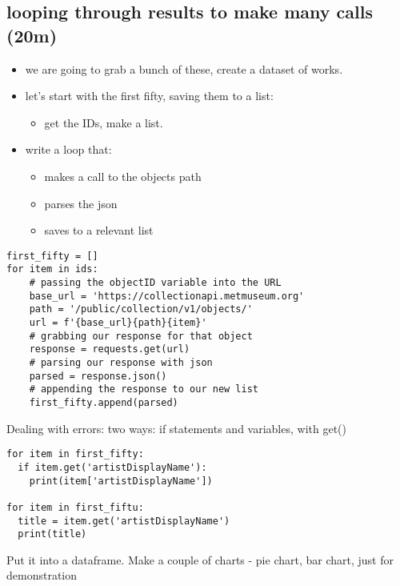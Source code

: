 \documentclass[11pt]{article}
\begin{document}
\subsection{looping through results to make many calls (20m)}
\label{sec:orgd85b085}
\begin{itemize}
\item we are going to grab a bunch of these, create a dataset of works.
\item let's start with the first fifty, saving them to a list:
\begin{itemize}
\item get the IDs, make a list.
\end{itemize}
\item write a loop that:
\begin{itemize}
\item makes a call to the objects path
\item parses the json
\item saves to a relevant list
\end{itemize}
\end{itemize}

\begin{verbatim}
first_fifty = []
for item in ids:
    # passing the objectID variable into the URL
    base_url = 'https://collectionapi.metmuseum.org'
    path = '/public/collection/v1/objects/'
    url = f'{base_url}{path}{item}'
    # grabbing our response for that object
    response = requests.get(url)
    # parsing our response with json
    parsed = response.json()
    # appending the response to our new list
    first_fifty.append(parsed)
\end{verbatim}

Dealing with errors: two ways: if statements and variables, with get()

\begin{verbatim}
for item in first_fifty:
  if item.get('artistDisplayName'):
    print(item['artistDisplayName'])

for item in first_fiftu: 
  title = item.get('artistDisplayName')
  print(title)
\end{verbatim}

Put it into a dataframe. Make a couple of charts - pie chart, bar
chart, just for demonstration
\end{document}
